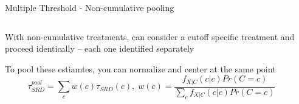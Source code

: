 \documentclass[notes,11pt, aspectratio=169]{beamer}
\newenvironment{wideitemize}{\itemize\addtolength{\itemsep}{10pt}}{\enditemize}
\begin{document}
\begin{frame}{Multiple Threshold - Non-cumulative pooling}
  \begin{columns}[onlytextwidth, T] %
    \begin{column}{.6\textwidth}
      \begin{wideitemize}
      \item With non-cumulative treatments, can consider a cutoff specific
        treatment and proceed identically -- each one identified separately
      \item To pool these estiamtes, you can normalize and center at the same point
        \begin{equation}
          \tau_{SRD}^{pool} = \sum_{c} w(c) \tau_{SRD}(c), \; w(c) = \frac{f_{X|C}(c|c) Pr(C = c)}{\sum_{c}f_{X|C}(c|c) Pr(C = c)}
        \end{equation}
      \end{wideitemize}
    \end{column}
    \begin{column}{.4\textwidth}
    \end{column}%
  \end{columns}
\end{frame}
\end{document}
